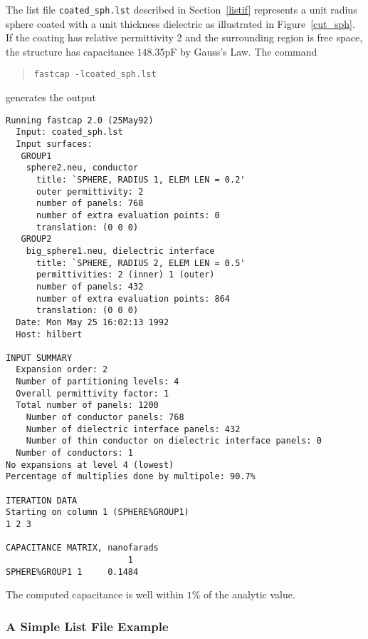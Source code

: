 The list file \verb#coated_sph.lst# described in Section~\ref{listif}
represents
a unit radius sphere coated with a unit thickness dielectric as
illustrated in Figure~\ref{cut_sph}.
If the coating has relative permittivity 2 and the surrounding
region is free space, the structure has capacitance
$148.35$pF by Gauss's Law. The command
\begin{quote}
\verb#fastcap -lcoated_sph.lst#
\end{quote}
generates the output
\begin{verbatim}
Running fastcap 2.0 (25May92)
  Input: coated_sph.lst
  Input surfaces:
   GROUP1
    sphere2.neu, conductor
      title: `SPHERE, RADIUS 1, ELEM LEN = 0.2'
      outer permittivity: 2
      number of panels: 768
      number of extra evaluation points: 0
      translation: (0 0 0)
   GROUP2
    big_sphere1.neu, dielectric interface
      title: `SPHERE, RADIUS 2, ELEM LEN = 0.5'
      permittivities: 2 (inner) 1 (outer)
      number of panels: 432
      number of extra evaluation points: 864
      translation: (0 0 0)
  Date: Mon May 25 16:02:13 1992
  Host: hilbert

INPUT SUMMARY
  Expansion order: 2
  Number of partitioning levels: 4
  Overall permittivity factor: 1
  Total number of panels: 1200
    Number of conductor panels: 768
    Number of dielectric interface panels: 432
    Number of thin conductor on dielectric interface panels: 0
  Number of conductors: 1
No expansions at level 4 (lowest)
Percentage of multiplies done by multipole: 90.7%

ITERATION DATA
Starting on column 1 (SPHERE%GROUP1)
1 2 3

CAPACITANCE MATRIX, nanofarads
                        1
SPHERE%GROUP1 1     0.1484
\end{verbatim}
The computed capacitance is well within $1\%$ of the analytic value.

\subsubsection{A Simple List File Example}
\label{listeg}

